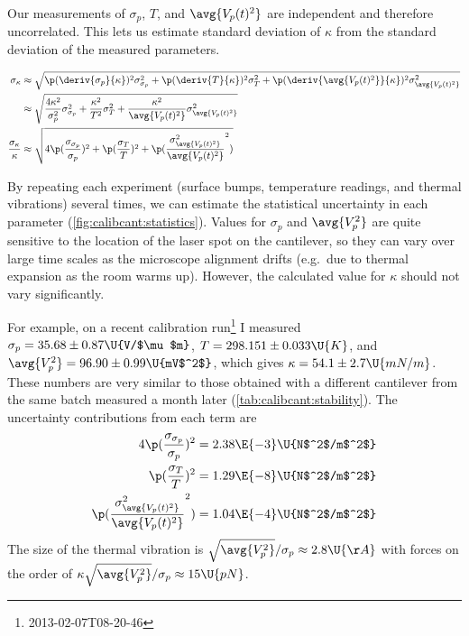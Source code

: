Our measurements of $\sigma_p$, $T$, and $\avg{V_p(t)^2}$ are
independent and therefore uncorrelated.  This lets us estimate
standard deviation of $\kappa$ from the standard deviation of the
measured parameters\citep{ku66}.

\begin{align}
  \sigma_\kappa &\approx \sqrt{
      \p({\deriv{\sigma_p}{\kappa}})^2 \sigma_{\sigma_p}^2 +
      \p({\deriv{T}{\kappa}})^2 \sigma_{T}^2 +
      \p({\deriv{\avg{V_p(t)^2}}{\kappa}})^2 \sigma_{\avg{V_p(t)^2}}^2
      } \\
    &\approx \sqrt{
      \frac{4\kappa^2}{\sigma_p^2} \sigma_{\sigma_p}^2 +
      \frac{\kappa^2}{T^2} \sigma_{T}^2 +
      \frac{\kappa^2}{\avg{V_p(t)^2}} \sigma_{\avg{V_p(t)^2}}^2
      } \\
  \frac{\sigma_\kappa}{\kappa} &\approx \sqrt{
      4\p({\frac{\sigma_{\sigma_p}}{\sigma_p}})^2 +
      \p({\frac{\sigma_{T}}{T}})^2 +
      \p({\frac{\sigma_{\avg{V_p(t)^2}}^2}{\avg{V_p(t)^2}}^2})
    }
\end{align}

By repeating each experiment (surface bumps, temperature readings, and
thermal vibrations) several times, we can estimate the statistical
uncertainty in each parameter (\cref{fig:calibcant:statistics}).
Values for $\sigma_p$ and $\avg{V_p^2}$ are quite sensitive to the
location of the laser spot on the cantilever, so they can vary over
large time scales as the microscope alignment drifts (e.g.~due to
thermal expansion as the room warms up).  However, the calculated
value for $\kappa$ should not vary significantly.

For example, on a recent calibration run\footnote{2013-02-07T08-20-46}
I measured $\sigma_p=35.68\pm0.87\U{V/$\mu$m}$,
$T=298.151\pm0.033\U{K}$, and $\avg{V_p^2}=96.90\pm0.99\U{mV$^2$}$,
which gives $\kappa=54.1\pm2.7\U{mN/m}$.  These numbers are very
similar to those obtained with a different cantilever from the same
batch measured a month later (\cref{tab:calibcant:stability}).  The
uncertainty contributions from each term are
\begin{align}
  4\p({\frac{\sigma_{\sigma_p}}{\sigma_p}})^2 &= 2.38\E{-3}\U{N$^2$/m$^2$} \\
  \p({\frac{\sigma_{T}}{T}})^2 &= 1.29\E{-8}\U{N$^2$/m$^2$} \\
  \p({\frac{\sigma_{\avg{V_p(t)^2}}^2}{\avg{V_p(t)^2}}^2})
    &= 1.04\E{-4}\U{N$^2$/m$^2$}
\end{align}
The size of the thermal vibration is
$\sqrt{\avg{V_p^2}}/\sigma_p\approx2.8\U{\AA}$ with forces on the
order of $\kappa\sqrt{\avg{V_p^2}}/\sigma_p\approx15\U{pN}$.

